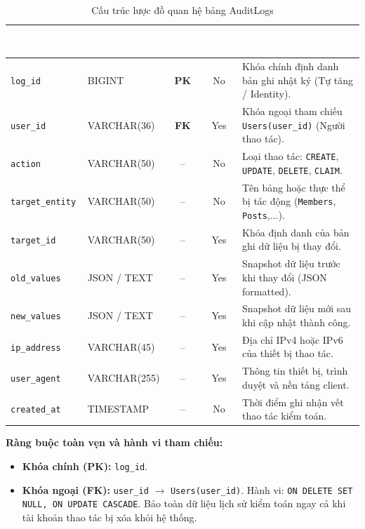 \begin{table}[H]
    \centering
    \small
    \renewcommand{\arraystretch}{1.2}
    \begin{tabularx}{\textwidth}{p{3.0cm} p{2.6cm} c c X}
        \toprule
        \rowcolor{tableheader}\textcolor{white}{\textbf{Tên thuộc tính}} & \textcolor{white}{\textbf{Kiểu logic}} & \textcolor{white}{\textbf{Khóa}} & \textcolor{white}{\textbf{Null?}} & \textcolor{white}{\textbf{Diễn giải \& Ràng buộc tham chiếu}} \\
        \midrule
        \rowcolor{tablerowalt}
        \texttt{log\_id} & BIGINT & \textcolor{pkcolor}{\textbf{PK}} & No & Khóa chính định danh bản ghi nhật ký (Tự tăng / Identity). \\
        \texttt{user\_id} & VARCHAR(36) & \textcolor{fkcolor}{\textbf{FK}} & Yes & Khóa ngoại tham chiếu \texttt{Users(user\_id)} (Người thao tác). \\
        \rowcolor{tablerowalt}
        \texttt{action} & VARCHAR(50) & -- & No & Loại thao tác: \texttt{CREATE}, \texttt{UPDATE}, \texttt{DELETE}, \texttt{CLAIM}. \\
        \texttt{target\_entity} & VARCHAR(50) & -- & No & Tên bảng hoặc thực thể bị tác động (\texttt{Members}, \texttt{Posts},...). \\
        \rowcolor{tablerowalt}
        \texttt{target\_id} & VARCHAR(50) & -- & Yes & Khóa định danh của bản ghi dữ liệu bị thay đổi. \\
        \texttt{old\_values} & JSON / TEXT & -- & Yes & Snapshot dữ liệu trước khi thay đổi (JSON formatted). \\
        \rowcolor{tablerowalt}
        \texttt{new\_values} & JSON / TEXT & -- & Yes & Snapshot dữ liệu mới sau khi cập nhật thành công. \\
        \texttt{ip\_address} & VARCHAR(45) & -- & Yes & Địa chỉ IPv4 hoặc IPv6 của thiết bị thao tác. \\
        \rowcolor{tablerowalt}
        \texttt{user\_agent} & VARCHAR(255) & -- & Yes & Thông tin thiết bị, trình duyệt và nền tảng client. \\
        \texttt{created\_at} & TIMESTAMP & -- & No & Thời điểm ghi nhận vết thao tác kiểm toán. \\
        \bottomrule
    \end{tabularx}
    \caption{Cấu trúc lược đồ quan hệ bảng AuditLogs}
    \label{tab:schema_audit_logs}
\end{table}

\noindent\textbf{Ràng buộc toàn vẹn và hành vi tham chiếu:}
\begin{itemize}[noitemsep,topsep=2pt]
    \item \textbf{Khóa chính (PK):} \texttt{log\_id}.
    \item \textbf{Khóa ngoại (FK):} \texttt{user\_id} $\rightarrow$ \texttt{Users(user\_id)}. Hành vi: \texttt{ON DELETE SET NULL, ON UPDATE CASCADE}. Bảo toàn dữ liệu lịch sử kiểm toán ngay cả khi tài khoản thao tác bị xóa khỏi hệ thống.
\end{itemize}

